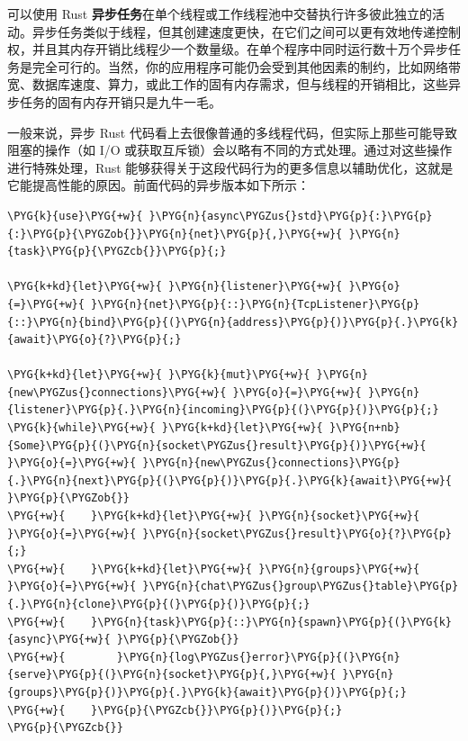 可以使用 Rust \textbf{异步任务}在单个线程或工作线程池中交替执行许多彼此独立的活动。异步任务类似于线程，但其创建速度更快，在它们之间可以更有效地传递控制权，并且其内存开销比线程少一个数量级。在单个程序中同时运行数十万个异步任务是完全可行的。当然，你的应用程序可能仍会受到其他因素的制约，比如网络带宽、数据库速度、算力，或此工作的固有内存需求，但与线程的开销相比，这些异步任务的固有内存开销只是九牛一毛。

一般来说，异步 Rust 代码看上去很像普通的多线程代码，但实际上那些可能导致阻塞的操作（如 I/O 或获取互斥锁）会以略有不同的方式处理。通过对这些操作进行特殊处理，Rust 能够获得关于这段代码行为的更多信息以辅助优化，这就是它能提高性能的原因。前面代码的异步版本如下所示：

\begin{Verbatim}[commandchars=\\\{\},breaklines=true,breakanywhere=true,fontsize=\codefont,xleftmargin=17bp]
\PYG{k}{use}\PYG{+w}{ }\PYG{n}{async\PYGZus{}std}\PYG{p}{:}\PYG{p}{:}\PYG{p}{\PYGZob{}}\PYG{n}{net}\PYG{p}{,}\PYG{+w}{ }\PYG{n}{task}\PYG{p}{\PYGZcb{}}\PYG{p}{;}

\PYG{k+kd}{let}\PYG{+w}{ }\PYG{n}{listener}\PYG{+w}{ }\PYG{o}{=}\PYG{+w}{ }\PYG{n}{net}\PYG{p}{::}\PYG{n}{TcpListener}\PYG{p}{::}\PYG{n}{bind}\PYG{p}{(}\PYG{n}{address}\PYG{p}{)}\PYG{p}{.}\PYG{k}{await}\PYG{o}{?}\PYG{p}{;}

\PYG{k+kd}{let}\PYG{+w}{ }\PYG{k}{mut}\PYG{+w}{ }\PYG{n}{new\PYGZus{}connections}\PYG{+w}{ }\PYG{o}{=}\PYG{+w}{ }\PYG{n}{listener}\PYG{p}{.}\PYG{n}{incoming}\PYG{p}{(}\PYG{p}{)}\PYG{p}{;}
\PYG{k}{while}\PYG{+w}{ }\PYG{k+kd}{let}\PYG{+w}{ }\PYG{n+nb}{Some}\PYG{p}{(}\PYG{n}{socket\PYGZus{}result}\PYG{p}{)}\PYG{+w}{ }\PYG{o}{=}\PYG{+w}{ }\PYG{n}{new\PYGZus{}connections}\PYG{p}{.}\PYG{n}{next}\PYG{p}{(}\PYG{p}{)}\PYG{p}{.}\PYG{k}{await}\PYG{+w}{ }\PYG{p}{\PYGZob{}}
\PYG{+w}{    }\PYG{k+kd}{let}\PYG{+w}{ }\PYG{n}{socket}\PYG{+w}{ }\PYG{o}{=}\PYG{+w}{ }\PYG{n}{socket\PYGZus{}result}\PYG{o}{?}\PYG{p}{;}
\PYG{+w}{    }\PYG{k+kd}{let}\PYG{+w}{ }\PYG{n}{groups}\PYG{+w}{ }\PYG{o}{=}\PYG{+w}{ }\PYG{n}{chat\PYGZus{}group\PYGZus{}table}\PYG{p}{.}\PYG{n}{clone}\PYG{p}{(}\PYG{p}{)}\PYG{p}{;}
\PYG{+w}{    }\PYG{n}{task}\PYG{p}{::}\PYG{n}{spawn}\PYG{p}{(}\PYG{k}{async}\PYG{+w}{ }\PYG{p}{\PYGZob{}}
\PYG{+w}{        }\PYG{n}{log\PYGZus{}error}\PYG{p}{(}\PYG{n}{serve}\PYG{p}{(}\PYG{n}{socket}\PYG{p}{,}\PYG{+w}{ }\PYG{n}{groups}\PYG{p}{)}\PYG{p}{.}\PYG{k}{await}\PYG{p}{)}\PYG{p}{;}
\PYG{+w}{    }\PYG{p}{\PYGZcb{}}\PYG{p}{)}\PYG{p}{;}
\PYG{p}{\PYGZcb{}}
\end{Verbatim}

